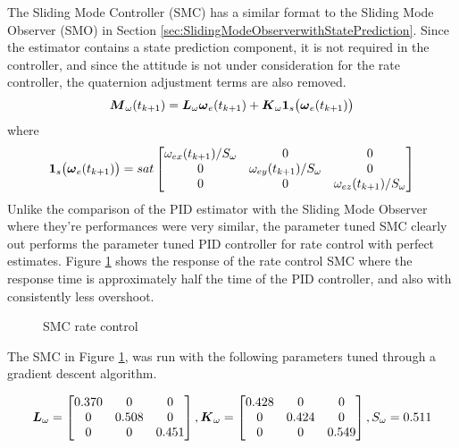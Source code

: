 The Sliding Mode Controller (SMC) has a similar format to the Sliding Mode Observer (SMO) in Section \ref{sec:SlidingModeObserverwithStatePrediction}.  Since the estimator contains a state prediction component, it is not required in the controller, and since the attitude is not under consideration for the rate controller, the quaternion adjustment terms are also removed.
\begin{equation}
  \boldsymbol{M}_{\omega}(t_{k+1}) = \boldsymbol{L}_{\omega} \boldsymbol{\omega}_e(t_{k+1}) + \boldsymbol{K}_{\omega}\boldsymbol{1}_s \big(\boldsymbol{\omega}_e(t_{k+1}) \big)
  \label{eqn:SMController}
\end{equation}
where
\begin{equation}
  \boldsymbol{1}_s \big(\boldsymbol{\omega}_e(t_{k+1}) \big) = sat \begin{bmatrix} \omega_{ex}(t_{k+1}) / S_{\omega} &0 &0 \\ 0 & \omega_{ey}(t_{k+1}) / S_{\omega} & 0 \\ 0 & 0 & \omega_{ez}(t_{k+1}) / S_{\omega} \end{bmatrix}
\end{equation}
Unlike the comparison of the PID estimator with the Sliding Mode Observer where they're performances were very similar, the parameter tuned SMC clearly out performs the parameter tuned PID controller for rate control with perfect estimates.  Figure \ref{fig:SMCRateControl} shows the response of the rate control SMC where the response time is approximately half the time of the PID controller, and also with consistently less overshoot.

\begin{figure}[H]
  \centerline{}
  \caption{SMC rate control}
  \label{fig:SMCRateControl}
\end{figure}

The SMC in Figure \ref{fig:SMCRateControl}, was run with the following parameters tuned through a gradient descent algorithm.

\begin{equation}
    \boldsymbol{L}_{\omega} = \begin{bmatrix} 0.370 & 0 & 0 \\ 0 & 0.508 & 0 \\ 0 & 0 & 0.451 \end{bmatrix},
    \boldsymbol{K}_{\omega} = \begin{bmatrix} 0.428 & 0 & 0 \\ 0 & 0.424 & 0 \\ 0 & 0 & 0.549 \end{bmatrix},
    S_{\omega} = 0.511
  \label{SMCRateControlGains}
\end{equation}

